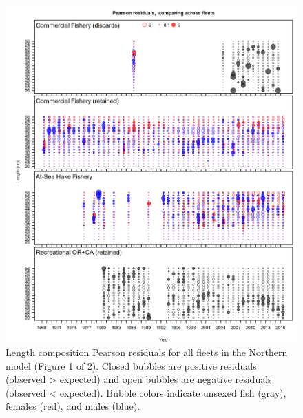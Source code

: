 \documentclass[12pt,]{article}
\begin{document}
\begin{figure}[htbp]
\centering
\includegraphics{r4ss/plots_mod1/comp_lenfit__page1_multi-fleet_comparison.png}
\caption{Length composition Pearson residuals for all fleets in the
Northern model (Figure 1 of 2). Closed bubbles are positive residuals
(observed \textgreater{} expected) and open bubbles are negative
residuals (observed \textless{} expected). Bubble colors indicate
unsexed fish (gray), females (red), and males
(blue).\label{fig:comp_Pearson_length_mod1_page1}}
\end{figure}
\end{document}
